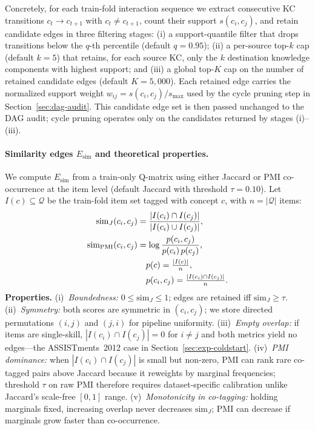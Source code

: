 \documentclass[runningheads]{llncs}
\newcommand{\Esim}{\ensuremath{E_{\text{sim}}}}
\newcommand{\KCs}{knowledge components}
\begin{document}
Concretely, for each train-fold interaction sequence we extract
consecutive KC transitions $c_{t} \rightarrow c_{t+1}$ with
$c_{t} \neq c_{t+1}$, count their support $s(c_i, c_j)$, and retain
candidate edges in three filtering stages:
(i) a support-quantile filter that drops transitions below the
$q$-th percentile (default $q = 0.95$);
(ii) a per-source top-$k$ cap (default $k = 5$) that retains, for each
source KC, only the $k$ destination \KCs{} with highest support; and
(iii) a global top-$K$ cap on the number of retained candidate edges
(default $K = 5{,}000$). Each retained edge carries the normalized
support weight $w_{ij} = s(c_i, c_j) / s_{\max}$ used by the cycle
pruning step in Section~\ref{sec:dag-audit}. This candidate edge set
is then passed unchanged to the DAG audit; cycle pruning operates only
on the candidates returned by stages (i)--(iii).

\paragraph{Similarity edges $\Esim$ and theoretical properties.}
\label{sec:graph-sim-theory}
We compute $\Esim$ from a train-only Q-matrix using either Jaccard or
PMI co-occurrence at the item level (default Jaccard with threshold
$\tau{=}0.10$). Let $I(c)\subseteq\mathcal{Q}$ be the train-fold item
set tagged with concept $c$, with $n=|\mathcal{Q}|$ items:
\begin{align}
\mathrm{sim}_J(c_i,c_j) &=
  \frac{|I(c_i)\cap I(c_j)|}{|I(c_i)\cup I(c_j)|},
  \label{eq:sim-jaccard}\\
\mathrm{sim}_{\mathrm{PMI}}(c_i,c_j) &=
  \log \frac{p(c_i,c_j)}{p(c_i)\,p(c_j)},
  \label{eq:sim-pmi}\notag\\
&\quad p(c)=\tfrac{|I(c)|}{n},\notag\\
&\quad p(c_i,c_j)=\tfrac{|I(c_i)\cap I(c_j)|}{n}.
\end{align}
\textbf{Properties.}
(i)~\emph{Boundedness:} $0\le \mathrm{sim}_J\le 1$; edges are retained
iff $\mathrm{sim}_J\ge\tau$.
(ii)~\emph{Symmetry:} both scores are symmetric in $(c_i,c_j)$; we store
directed permutations $(i,j)$ and $(j,i)$ for pipeline uniformity.
(iii)~\emph{Empty overlap:} if items are single-skill,
$|I(c_i)\cap I(c_j)|=0$ for $i\neq j$ and both metrics yield no edges---the
ASSISTments~2012 case in Section~\ref{sec:exp-coldstart}.
(iv)~\emph{PMI dominance:} when $|I(c_i)\cap I(c_j)|$ is small but
non-zero, PMI can rank rare co-tagged pairs above Jaccard because it
reweights by marginal frequencies; threshold $\tau$ on raw PMI therefore
requires dataset-specific calibration unlike Jaccard's scale-free
$[0,1]$ range.
(v)~\emph{Monotonicity in co-tagging:} holding marginals fixed,
increasing overlap never decreases $\mathrm{sim}_J$; PMI can decrease if
marginals grow faster than co-occurrence.
\end{document}
